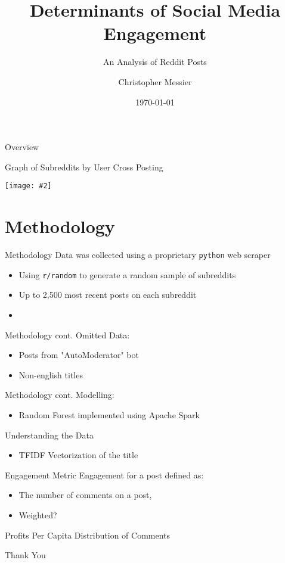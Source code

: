 \documentclass[10pt,t]{beamer}
\title{Determinants of Social Media Engagement}
\subtitle{An Analysis of Reddit Posts}
\author[Messier]{Christopher Messier}
\institute[GA]{General Assembly\\Washington, D.C.}
\date{\today}
\newcommand{\bi}{\begin{itemize}}                                 %
\newcommand{\ei}{\end{itemize}}                                   %
\newcommand*{\ig}[2]{{\centering\texttt{[image: \#2]}\par}}    %
\begin{document}
\linespread{2}

\begin{frame}
	\titlepage
\end{frame}

\begin{frame}{Overview}
	\tableofcontents
\end{frame}

\begin{frame}[fragile, c]{Graph of Subreddits by User Cross Posting}
	\ig{width=.75\textwidth}{subreddit_graph.png}
\end{frame}


\section{Methodology}
\begin{frame}{Methodology}
	Data was collected using a proprietary \texttt{python} web scraper
	\bi 
		\item Using \texttt{r/random} to generate a random sample of subreddits
		\item Up to 2,500 most recent posts on each subreddit
		\item 
	\ei 
\end{frame}

\begin{frame}{Methodology cont.}
	Omitted Data:
	\bi
		\item Posts from "AutoModerator" bot
		\item Non-english titles
	\ei	
\end{frame}

\begin{frame}{Methodology cont.}
	Modelling:
	\bi
		\item Random Forest implemented using Apache Spark
	\ei
\end{frame}


\begin{frame}{Understanding the Data}
	\bi
		\item TFIDF Vectorization of the title
	\ei 
\end{frame}

\begin{frame}{Engagement Metric}
Engagement for a post defined as:
	\bi
		\item The number of comments on a post, 
		\item Weighted?
	\ei
\end{frame}

\begin{frame}[fragile, c]{Profits Per Capita}  %
	Distribution of Comments
\end{frame}

\begin{frame}[fragile, c]  %
	\begin{center}
		\Large{Thank You}
	\end{center}
\end{frame}
\end{document}
